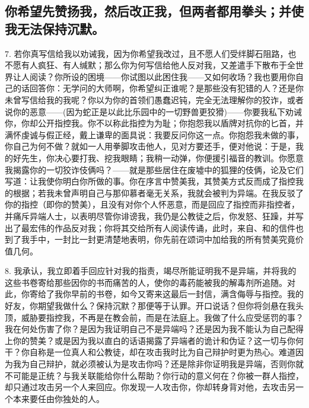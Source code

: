 
\subsection{你希望先赞扬我，然后改正我，但两者都用拳头；并使我无法保持沉默。}

7. 若你真写信给我以劝诫我，因为你希望我改过，且不愿人们受绊脚石阻路，也不愿有人疯狂、有人缄默；那么你为何写信给他人反对我，又差遣手下散布于全世界让人阅读？你所设的困境——你试图以此困住我——又如何收场？我也要用你自己的话回答你：无学问的大师啊，你希望纠正谁呢？是那些没有犯错的人？还是你未曾写信给我的我呢？你以为你的首领们愚蠢迟钝，完全无法理解你的狡诈，或者说你的恶意——(因为蛇正是以此比乐园中的一切野兽更狡猾)——你要我私下劝诫你，你却公开指控我。你不以称此指控为为耻；你抱怨我以盾牌对抗你的匕首，并满怀虔诚与假正经，戴上谦卑的面具说：我要反问你这一点。你抱怨我未做的事，你自己为何不做？就如一人用拳脚攻击他人，见对方要还手，便对他说：于是，我的好先生，你决心要打我、挖我眼睛；我稍一动弹，你便援引福音的教训。你愿意我揭露你的一切狡诈伎俩吗？——就是那些居住在废墟中的狐狸的伎俩，论及它们写道：让我使你明白你所做的事。你在序言中赞美我，其赞美方式反而成了指控我的根据；若我未曾声明自己与那仰慕者毫无关系，我就会被判为异端。在我反驳了你的指控（即你的赞美），且没有对你个人怀恶意，而是回应了指控而非指控者，并痛斥异端人士，以表明尽管你诽谤我，我仍是公教徒之后，你发怒、狂躁，并写出了最宏伟的作品反对我；你将其交给所有人阅读传诵，此时，来自、和的信件也到了我手中，一封比一封更清楚地表明，你先前在颂词中加给我的所有赞美究竟价值几何。\par

8. 我承认，我立即着手回应针对我的指责，竭尽所能证明我不是异端，并将我的这些书卷寄给那些因你的书而痛苦的人，使你的毒药能被我的解毒剂所追随。对此，你寄给了我你早前的书卷，如今又寄来这最后一封信，满含侮辱与指控。我的好友，你期望我做什么？保持沉默？那便等于认罪。开口说话？但你将剑悬在我头顶，威胁要指控我，不再是在教会前，而是在法庭上。我做了什么应受惩罚的事？我在何处伤害了你？是因为我证明自己不是异端吗？还是因为我不能认为自己配得上你的赞美？或是因为我以直白的话语揭露了异端者的诡计和伪证？这一切与你何干？你自称是一位真人和公教徒，却在攻击我时比为自己辩护时更为热心。难道因为我为自己辩护，就必须被认为是攻击你吗？还是除非你证明我是异端，否则你就不可能是正统？与我关联能给你什么帮助？你行动的意义何在？你被一群人指控，却只通过攻击另一个人来回应。你发现一人攻击你，你却转身背对他，去攻击另一个本来要任由你独处的人。\par

